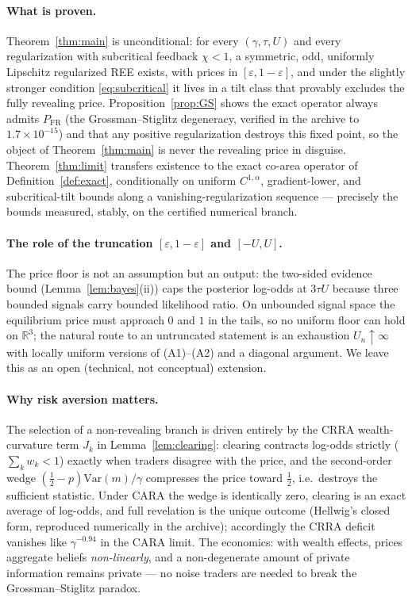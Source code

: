 \documentclass[11pt]{article}
\theoremstyle{definition}
\newcommand{\R}{\mathbb{R}}
\begin{document}
\paragraph{What is proven.}
Theorem~\ref{thm:main} is unconditional: for every $(\gamma,\tau,U)$ and
every regularization with subcritical feedback $\chi<1$, a symmetric, odd,
uniformly Lipschitz regularized REE exists, with prices in
$[\varepsilon,1-\varepsilon]$, and under the slightly stronger condition
\eqref{eq:subcritical} it lives in a tilt class that provably excludes the
fully revealing price. Proposition~\ref{prop:GS} shows the exact operator
always admits $P_{\mathrm{FR}}$ (the Grossman--Stiglitz degeneracy, verified
in the archive to $1.7\times10^{-15}$) and that any positive regularization
destroys this fixed point, so the object of Theorem~\ref{thm:main} is never
the revealing price in disguise. Theorem~\ref{thm:limit} transfers
existence to the exact co-area operator of Definition~\ref{def:exact},
conditionally on uniform $C^{1,\alpha}$, gradient-lower, and
subcritical-tilt bounds along a vanishing-regularization sequence —
precisely the bounds measured, stably, on the certified numerical branch.

\paragraph{The role of the truncation $[\varepsilon,1-\varepsilon]$ and
$[-U,U]$.}
The price floor is not an assumption but an output: the two-sided evidence
bound (Lemma~\ref{lem:bayes}(ii)) caps the posterior log-odds at
$3\tau U$ because three bounded signals carry bounded likelihood ratio. On
unbounded signal space the equilibrium price must approach $0$ and $1$ in
the tails, so no uniform floor can hold on $\R^3$; the natural route to an
untruncated statement is an exhaustion $U_n\uparrow\infty$ with locally
uniform versions of (A1)--(A2) and a diagonal argument. We leave this as an
open (technical, not conceptual) extension.

\paragraph{Why risk aversion matters.}
The selection of a non-revealing branch is driven entirely by the CRRA
wealth-curvature term $J_k$ in Lemma~\ref{lem:clearing}: clearing contracts
log-odds strictly ($\sum_k w_k<1$) exactly when traders disagree with the
price, and the second-order wedge $(\tfrac12-p)\mathrm{Var}(m)/\gamma$
compresses the price toward $\tfrac12$, i.e.\ destroys the sufficient
statistic. Under CARA the wedge is identically zero, clearing is an exact
average of log-odds, and full revelation is the unique outcome (Hellwig's
closed form, reproduced numerically in the archive); accordingly the CRRA
deficit vanishes like $\gamma^{-0.94}$ in the CARA limit. The economics:
with wealth effects, prices aggregate beliefs \emph{non-linearly}, and a
non-degenerate amount of private information remains private — no noise
traders are needed to break the Grossman--Stiglitz paradox.
\end{document}
